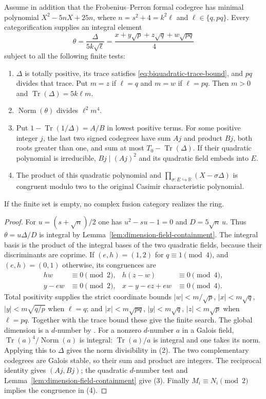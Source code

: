 \begin{proposition}
\label{prop:biquadratic-trace-obstruction}
Assume in addition that the Frobenius--Perron formal codegree has minimal
polynomial $X^2-5nX+25n$, where $n=s^2+4=k^2\ell$ and
$\ell\in\{q,pq\}$.  Every categorification supplies an integral element
\[
\theta=\frac{\Delta}{5k\sqrt\ell}
=\frac{x+y\sqrt p+z\sqrt q+w\sqrt{pq}}4
\]
subject to all the following finite tests:
\begin{enumerate}
\item $\Delta$ is totally positive, its trace satisfies
\eqref{eq:biquadratic-trace-bound}, and $pq$ divides that trace.
Put $m=z$ if $\ell=q$ and $m=w$ if $\ell=pq$.  Then $m>0$ and
$\operatorname{Tr}(\Delta)=5k\ell m$.
\item $\operatorname{Norm}(\theta)$ divides $\ell^2m^4$.
\item Put $1-\operatorname{Tr}(1/\Delta)=A/B$ in lowest positive terms.
For some positive integer $j$, the last two signed codegrees have sum $Aj$
and product $Bj$, both roots greater than one, and sum at most
$T_0-\operatorname{Tr}(\Delta)$.  If their quadratic polynomial is
irreducible, $Bj\mid(Aj)^2$ and its quadratic field embeds into $E$.
\item The product of this quadratic polynomial and
$\prod_{\sigma:E\hookrightarrow\mathbb R}(X-\sigma\Delta)$ is congruent
modulo two to the original Casimir characteristic polynomial.
\end{enumerate}
If the finite set is empty, no complex fusion category realizes the ring.
\end{proposition}
\begin{proof}
For $u=(s+\sqrt n)/2$ one has $u^2-su-1=0$ and
$D=5\sqrt n\,u$.  Thus $\theta=u\Delta/D$ is integral by
Lemma~\ref{lem:dimension-field-containment}.
The integral basis is the product of the integral bases of the two quadratic
fields, because their discriminants are coprime.  If $(e,h)=(1,2)$ for
$q\equiv1\pmod4$, and $(e,h)=(0,1)$ otherwise, its congruences are
\[
\begin{aligned}
hw&\equiv0\pmod2,& h(z-w)&\equiv0\pmod4,\\
y-ew&\equiv0\pmod2,& x-y-ez+ew&\equiv0\pmod4.
\end{aligned}
\]
Total positivity supplies the strict coordinate bounds
$|w|<m/\sqrt p$, $|x|<m\sqrt q$, $|y|<m\sqrt{q/p}$ when $\ell=q$;
and $|x|<m\sqrt{pq}$, $|y|<m\sqrt q$, $|z|<m\sqrt p$ when $\ell=pq$.
Together with the trace bound these give the finite search.
The global dimension is a $d$-number by \cite[Theorem~1.2]{Ocode}.  For a nonzero $d$-number $a$ in a
Galois field, $\operatorname{Tr}(a)^4/\operatorname{Norm}(a)$ is integral:
$\operatorname{Tr}(a)/a$ is integral and one takes its norm.  Applying this
to $\Delta$ gives the norm divisibility in (2).
The two complementary codegrees are Galois stable, so their sum and product
are integers.  The reciprocal identity gives $(Aj,Bj)$; the quadratic
$d$-number test and Lemma~\ref{lem:dimension-field-containment} give (3).
Finally $M_i\equiv N_i\pmod2$ implies the congruence in (4).
\end{proof}

